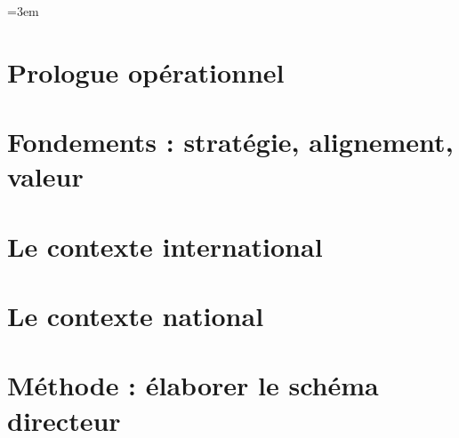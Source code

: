 \documentclass[12pt, twoside, openright, a4paper]{book}
\begin{document}
\emergencystretch=3em

\frontmatter

    
    \cleardoublepage

    
    \cleardoublepage

    
    \cleardoublepage

    
    \cleardoublepage

    \tableofcontents
    \cleardoublepage

    \listoftables
    \cleardoublepage

\mainmatter

    \part*{Prologue opérationnel}

        \setcounter{chapter}{-1}
        

    \part{Fondements : stratégie, alignement, valeur}
    \label{part:fondements}

        
        
        

    \part{Le contexte international}
    \label{part:international}

        
        

    \part{Le contexte national}
    \label{part:national}

        
        

    \part{Méthode : élaborer le schéma directeur}
    \label{part:methode}
\end{document}
